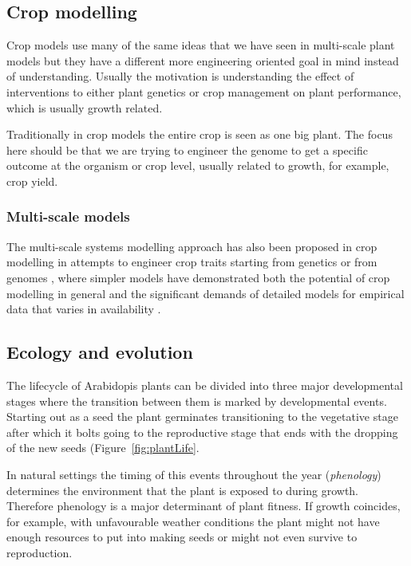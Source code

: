 \documentclass[phd]{infthesis}
\begin{document}
\subsection{Crop modelling}
Crop models use many of the same ideas that we have seen in multi-scale plant
models but they have a different more engineering oriented goal in
mind instead of understanding. Usually the motivation is understanding the
effect of interventions to either plant genetics or crop management on plant
performance, which is usually growth related.

Traditionally in crop models the entire crop is seen as one big plant.
The focus here should be that we are trying to engineer the genome to
get a specific outcome at the organism or crop level, usually related to
growth, for example, crop yield.



\subsubsection*{Multi-scale models}
The multi-scale systems modelling approach has also been proposed in crop
modelling in attempts to engineer crop traits starting from genetics or from
genomes \citep{welch_merging_2005, yin_applying_nodate, yin_modelling_2010,
  parent_can_2014, wu_connecting_2016, chenu_integrating_2018}, where simpler
models have demonstrated both the potential of crop modelling in general and the
significant demands of detailed models for empirical data that varies in
availability \citep{hammer_models_2006,asseng_uncertainty_2013}.


\subsection{Ecology and evolution}
The lifecycle of Arabidopis plants can be divided into three major
developmental stages where the transition between them is marked by
developmental events. Starting out as a seed the plant germinates transitioning
to the vegetative stage after which it bolts going to the reproductive stage
that ends with the dropping of the new seeds (Figure~\ref{fig:plantLife}.

In natural settings the timing of this events throughout the year
(\emph{phenology}) determines the environment that the plant is exposed to
during growth. Therefore phenology is a major determinant of plant fitness. If
growth coincides, for example, with unfavourable weather conditions the plant
might not have enough resources to put into making seeds or might not even
survive to reproduction.
\end{document}
